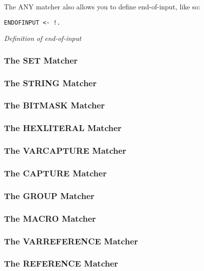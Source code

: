 The ANY matcher also allows you to define end-of-input, like so:

\begin{myquote}
\begin{verbatim}
ENDOFINPUT <- !.

\end{verbatim}
\end{myquote}
\textit{Definition of end-of-input}

\subsubsection{The SET Matcher}

\subsubsection{The STRING Matcher}

\subsubsection{The BITMASK Matcher}

\subsubsection{The HEXLITERAL Matcher}

\subsubsection{The VARCAPTURE Matcher}

\subsubsection{The CAPTURE Matcher}

\subsubsection{The GROUP Matcher}

\subsubsection{The MACRO Matcher}

\subsubsection{The VARREFERENCE Matcher}

\subsubsection{The REFERENCE Matcher}


